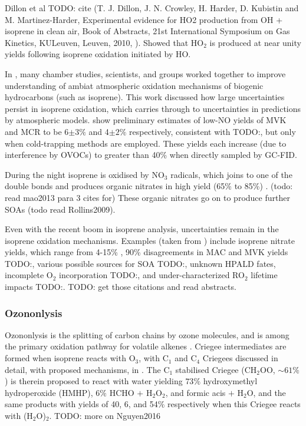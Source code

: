       Dillon et al TODO: cite (T. J. Dillon, J. N. Crowley, H. Harder, D. Kubistin and M. Martinez-Harder, Experimental evidence for HO2 production from OH + isoprene in clean air, Book of Abstracts, 21st International Symposium on Gas Kinetics, KULeuven, Leuven, 2010, ).
      Showed that HO$_2$ is produced at near unity yields following isoprene oxidation initiated by HO.
      
      In \cite{Nguyen2014}, many chamber studies, scientists, and groups worked together to improve understanding of ambiat atmospheric oxidation mechanisms of biogenic hydrocarbons (such as isoprene). 
      This work discussed how large uncertainties persist in isoprene oxidation, which carries through to uncertainties in predictions by atmospheric models.
      \citet{Nguyen2014} show preliminary estimates of low-NO yields of MVK and MCR to be 6$\pm3\%$ and 4$\pm2\%$ respectively, consistent with TODO:\citet{Liu2013}, but only when cold-trapping methods are employed.
      These yields each increase (due to interference by OVOCs) to greater than 40\% when directly sampled by GC-FID.
      
      During the night isoprene is oxidised by NO$_3$ radicals, which joins to one of the double bonds and produces organic nitrates in high yield (65\% to 85\%) \citep{Mao2013}. (todo: read mao2013 para 3 cites for)
      These organic nitrates go on to produce further SOAs \citep{Rollins2009} (todo read Rollins2009).
      
      Even with the recent boom in isoprene analysis, uncertainties remain in the isoprene oxidation mechanisms.
	    Examples (taken from \citet{Nguyen2014}) include isoprene nitrate yields, which range from 4-15\% \citep{Paulot2009a}, 90\% disagreements in MAC and MVK yields TODO:\citep{Liu2013}, various possible sources for SOA TODO:\citep{Chan2010, Surratt2010, Lin2013}, unknown HPALD fates, incomplete O$_2$ incorporation TODO:\citep{Peeters2009,Crounse2013}, and under-characterized RO$_2$ lifetime impacts TODO:\citep{Wolfe2012}. TODO: get those citations and read abstracts.
      
      \subsubsection{Ozononlysis}
      Ozononlysis is the splitting of carbon chains by ozone molecules, and is among the primary oxidation pathway for volatile alkenes \citep{Nguyen2016}.
      Criegee intermediates are formed when isoprene reacts with O$_3$, with C$_1$ and C$_4$ Criegees discussed in detail, with proposed mechanisms, in \cite{Nguyen2016}.
      The C$_1$ stabilised Criegee (CH$_2$OO, $\sim 61\%$) is therein proposed to react with water yielding $73\%$ hydroxymethyl hydroperoxide (HMHP), $6\%$ HCHO $+$ H$_2$O$_2$, and formic acis $+$ H$_2$O, and the same products with yields of 40, 6, and 54$\%$ respectively when this Criegee reacts with (H$_2$O)$_2$.
      TODO: more on Nguyen2016

